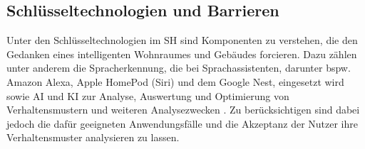     \subsection*{Schlüsseltechnologien und Barrieren}
        Unter den Schlüsseltechnologien im \acl{SH} sind Komponenten zu verstehen, die den Gedanken eines intelligenten 
        Wohnraumes und Gebäudes forcieren. Dazu zählen unter anderem die Spracherkennung, die bei Sprachassistenten, 
        darunter bspw. Amazon Alexa, Apple HomePod (Siri) und dem Google Nest, eingesetzt wird sowie \ac{AI} und \ac{KI} 
        zur Analyse, Auswertung und Optimierung von Verhaltensmustern und weiteren Analysezwecken \cite{statista2021}. 
        Zu berücksichtigen sind dabei jedoch die dafür geeigneten Anwendungsfälle und 
        die Akzeptanz der Nutzer ihre Verhaltensmuster analysieren zu lassen.
            
